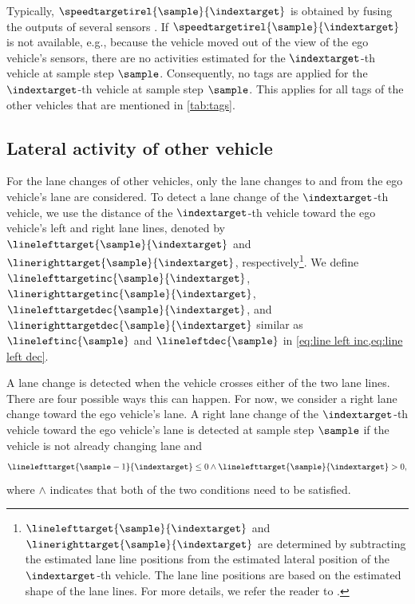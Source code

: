\begin{remark}
	\label{rem:no target}
	\cstarta Typically, $\speedtargetirel{\sample}{\indextarget}$ is obtained by fusing the outputs of several sensors \autocite{elfring2016effective}. 
	If $\speedtargetirel{\sample}{\indextarget}$ is not available, e.g., because the vehicle moved out of the view of the ego vehicle's sensors, there are no activities estimated for the $\indextarget$-th vehicle at sample step $\sample$. \cenda
	\cstartc Consequently, no tags are applied for the $\indextarget$-th vehicle at sample step $\sample$. This applies for all tags of the other vehicles that are mentioned in \cref{tab:tags}.\cendc
\end{remark}



\subsection{Lateral activity of other vehicle}
\label{sec:lateral other vehicles}

\cstartc
For the lane changes of other vehicles, only the lane changes to and from the ego vehicle's lane are considered.
To detect a lane change of the $\indextarget$-th vehicle, we use the distance of the $\indextarget$-th vehicle toward the ego vehicle's left and right lane lines, denoted by $\linelefttarget{\sample}{\indextarget}$ and $\linerighttarget{\sample}{\indextarget}$, respectively\cendc\cstartd\footnote{\cstartd $\linelefttarget{\sample}{\indextarget}$ and $\linerighttarget{\sample}{\indextarget}$ are determined by subtracting the estimated lane line positions from the estimated lateral position of the $\indextarget$-th vehicle. The lane line positions are based on the estimated shape of the lane lines. For more details, we refer the reader to \autocite{elfring2016effective}.\cendd}\cendd\cstartc.
We define $\linelefttargetinc{\sample}{\indextarget}$, $\linerighttargetinc{\sample}{\indextarget}$, $\linelefttargetdec{\sample}{\indextarget}$, and $\linerighttargetdec{\sample}{\indextarget}$ similar as $\lineleftinc{\sample}$ and $\lineleftdec{\sample}$ in \cref{eq:line left inc,eq:line left dec}.

A lane change is detected when the vehicle crosses either of the two lane lines.
There are four possible ways this can happen.
For now, we consider a right lane change toward the ego vehicle's lane.
A right lane change of the $\indextarget$-th vehicle toward the ego vehicle's lane is detected at sample step $\sample$ if the vehicle is not already changing lane and
\begin{equation}
	\label{eq:detect lane change target}
	\linelefttarget{\sample-1}{\indextarget} \leq 0 \land \linelefttarget{\sample}{\indextarget} > 0,
\end{equation}
where $\land$ indicates that both of the two conditions need to be satisfied.

